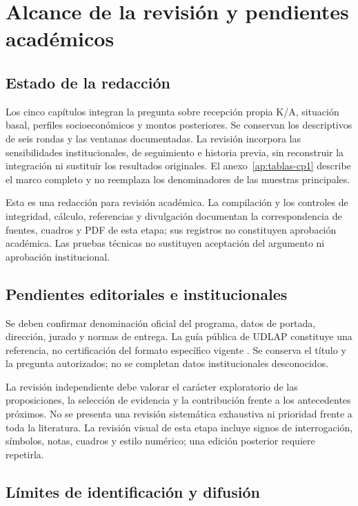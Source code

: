 \chapter{Alcance de la revisión y pendientes académicos}
\label{ap:pendientes}

\section{Estado de la redacción}

Los cinco capítulos integran la pregunta sobre recepción propia K/A,
situación basal, perfiles socioeconómicos y montos posteriores. Se conservan
los descriptivos de seis rondas y las ventanas documentadas. La revisión
incorpora las sensibilidades institucionales, de seguimiento e historia
previa, sin reconstruir la integración ni sustituir los resultados originales.
El anexo~\ref{ap:tablas-cp1} describe el marco completo y no reemplaza los
denominadores de las muestras principales.

Esta es una redacción para revisión académica. La compilación y los controles de integridad, cálculo, referencias y
divulgación documentan la correspondencia de fuentes, cuadros y PDF de esta
etapa; sus registros no constituyen aprobación académica.
Las pruebas técnicas no sustituyen aceptación del argumento ni aprobación
institucional.

\section{Pendientes editoriales e institucionales}

Se deben confirmar denominación oficial del programa, datos de portada,
dirección, jurado y normas de entrega. La guía pública de UDLAP constituye
una referencia, no certificación del formato específico vigente
\citep{udlap2024guia}. Se conserva el título y la pregunta autorizados;
no se completan datos institucionales desconocidos.

La revisión independiente debe valorar el carácter exploratorio de las
proposiciones, la selección de evidencia y la contribución frente a los
antecedentes próximos. No se presenta una revisión sistemática exhaustiva
ni prioridad frente a toda la literatura. La revisión visual de esta etapa incluye signos de interrogación, símbolos,
notas, cuadros y estilo numérico; una edición posterior requiere repetirla.

\section{Límites de identificación y difusión}

